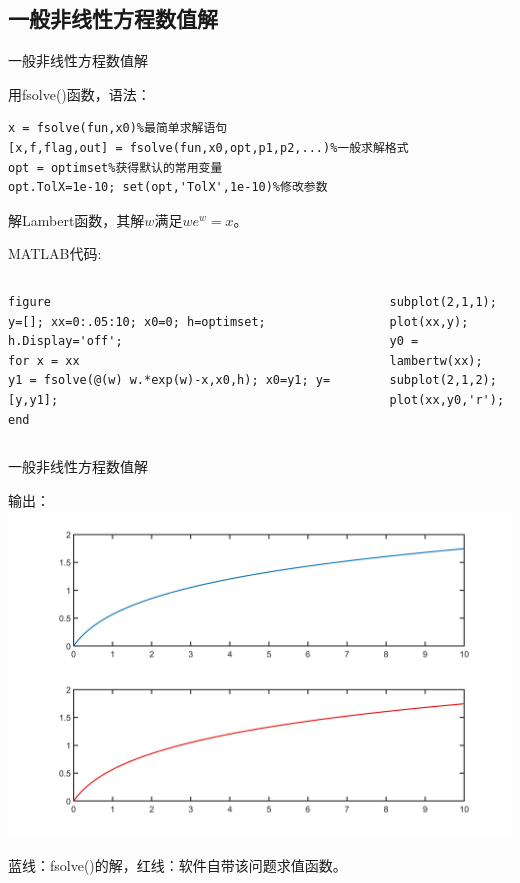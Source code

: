 \documentclass[12pt]{beamer}
\begin{document}
	\subsection{一般非线性方程数值解}
		\begin{frame}[fragile]{一般非线性方程数值解}
	\begin{block}{用fsolve()函数，语法：}
\begin{lstlisting}
x = fsolve(fun,x0)%最简单求解语句
[x,f,flag,out] = fsolve(fun,x0,opt,p1,p2,...)%一般求解格式
opt = optimset%获得默认的常用变量
opt.TolX=1e-10; set(opt,'TolX',1e-10)%修改参数
\end{lstlisting}
	\end{block}	  

	\begin{example}[6-8]
解Lambert函数，其解$w$满足$we^{w} = x$。
	\end{example}

	\begin{block}{MATLAB代码:}
		\begin{columns}[T]
\begin{lstlisting}
figure
y=[]; xx=0:.05:10; x0=0; h=optimset; h.Display='off';
for x = xx
y1 = fsolve(@(w) w.*exp(w)-x,x0,h); x0=y1; y=[y,y1];
end
\end{lstlisting}

\begin{lstlisting}
subplot(2,1,1);
plot(xx,y);
y0 = lambertw(xx);
subplot(2,1,2);
plot(xx,y0,'r');
\end{lstlisting}
		\end{columns}
	\end{block}
\end{frame}
\begin{frame}[fragile]{一般非线性方程数值解}
	\begin{block}{输出：}
		\centering
		\includegraphics[width=.7\textwidth]{13}
		
		{\color{cyan}蓝线}：fsolve()的解，{\color{red}红线}：软件自带该问题求值函数。
	\end{block}		
\end{frame}
\end{document}
